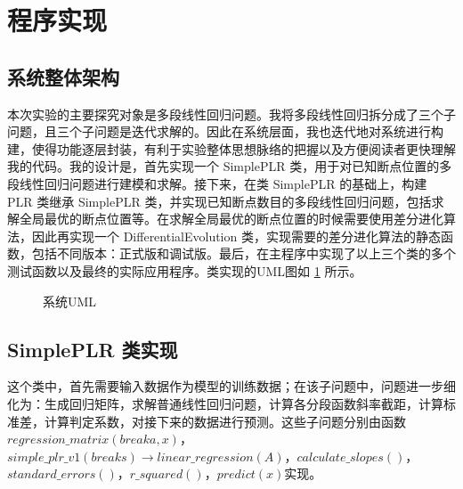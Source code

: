 
\section{程序实现}
\subsection{系统整体架构}

本次实验的主要探究对象是多段线性回归问题。我将多段线性回归拆分成了三个子问题，且三个子问题是迭代求解的。因此在系统层面，我也迭代地对系统进行构建，使得功能逐层封装，有利于实验整体思想脉络的把握以及方便阅读者更快理解我的代码。我的设计是，首先实现一个 SimplePLR 类，用于对已知断点位置的多段线性回归问题进行建模和求解。接下来，在类 SimplePLR 的基础上，构建 PLR 类继承 SimplePLR 类，并实现已知断点数目的多段线性回归问题，包括求解全局最优的断点位置等。在求解全局最优的断点位置的时候需要使用差分进化算法，因此再实现一个 DifferentialEvolution 类，实现需要的差分进化算法的静态函数，包括不同版本：正式版和调试版。最后，在主程序中实现了以上三个类的多个测试函数以及最终的实际应用程序。类实现的UML图如 \ref{image1} 所示。

\begin{figure}[H]
    \caption{系统UML}
    \label{image1}      
\end{figure}

\subsection{SimplePLR 类实现}

这个类中，首先需要输入数据作为模型的训练数据；在该子问题中，问题进一步细化为：生成回归矩阵，求解普通线性回归问题，计算各分段函数斜率截距，计算标准差，计算判定系数，对接下来的数据进行预测。这些子问题分别由函数$regression\_matrix(breaka,x)$，$simple\_plr\_v1(breaks) \rightarrow linear\_regression(A)$，$calculate\_slopes()$，$standard\_errors()$，$r\_squared()$，$predict(x)$实现。

